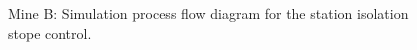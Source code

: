 \begin{appendices}
	\begin{figure}[h]
		\centering
		\caption{Mine B: Simulation process flow diagram for the station isolation stope control.}
		\label{fig: Stope layout}
	\end{figure}

\end{appendices}
